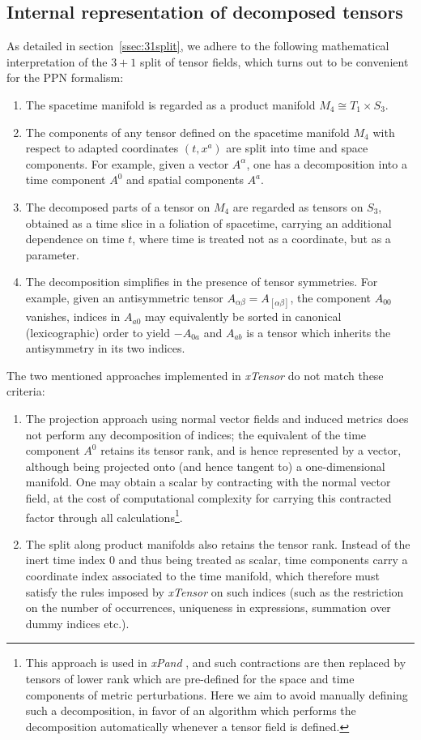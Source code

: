 \documentclass[notitlepage,a4paper,aps,prd,onecolumn,superscriptaddress,nofootinbib,groupedaddress,longbibliography]{revtex4-1}
\newcommand{\xTensor}{\emph{xTensor}}
\newcommand{\xPand}{\emph{xPand}}
\begin{document}
\subsection{Internal representation of decomposed tensors}\label{app:intrep}
As detailed in section~\ref{ssec:31split}, we adhere to the following mathematical interpretation of the $3+1$ split of tensor fields, which turns out to be convenient for the PPN formalism:
\begin{enumerate}
\item
The spacetime manifold is regarded as a product manifold \(M_4 \cong T_1 \times S_3\).
\item
The components of any tensor defined on the spacetime manifold \(M_4\) with respect to adapted coordinates \((t, x^a)\) are split into time and space components. For example, given a vector \(A^{\alpha}\), one has a decomposition into a time component \(A^0\) and spatial components \(A^a\).
\item
The decomposed parts of a tensor on \(M_4\) are regarded as tensors on \(S_3\), obtained as a time slice in a foliation of spacetime, carrying an additional dependence on time \(t\), where time is treated not as a coordinate, but as a parameter.
\item
The decomposition simplifies in the presence of tensor symmetries. For example, given an antisymmetric tensor \(A_{\alpha\beta} = A_{[\alpha\beta]}\), the component \(A_{00}\) vanishes, indices in \(A_{a0}\) may equivalently be sorted in canonical (lexicographic) order to yield \(-A_{0a}\) and \(A_{ab}\) is a tensor which inherits the antisymmetry in its two indices.
\end{enumerate}
The two mentioned approaches implemented in \xTensor{} do not match these criteria:
\begin{enumerate}
\item
The projection approach using normal vector fields and induced metrics does not perform any decomposition of indices; the equivalent of the time component \(A^0\) retains its tensor rank, and is hence represented by a vector, although being projected onto (and hence tangent to) a one-dimensional manifold. One may obtain a scalar by contracting with the normal vector field, at the cost of computational complexity for carrying this contracted factor through all calculations\footnote{This approach is used in \xPand{} \cite{Pitrou:2013hga}, and such contractions are then replaced by tensors of lower rank which are pre-defined for the space and time components of metric perturbations. Here we aim to avoid manually defining such a decomposition, in favor of an algorithm which performs the decomposition automatically whenever a tensor field is defined.}.
\item
The split along product manifolds also retains the tensor rank. Instead of the inert time index \(0\) and thus being treated as scalar, time components carry a coordinate index associated to the time manifold, which therefore must satisfy the rules imposed by \xTensor{} on such indices (such as the restriction on the number of occurrences, uniqueness in expressions, summation over dummy indices etc.).
\end{enumerate}
\end{document}
